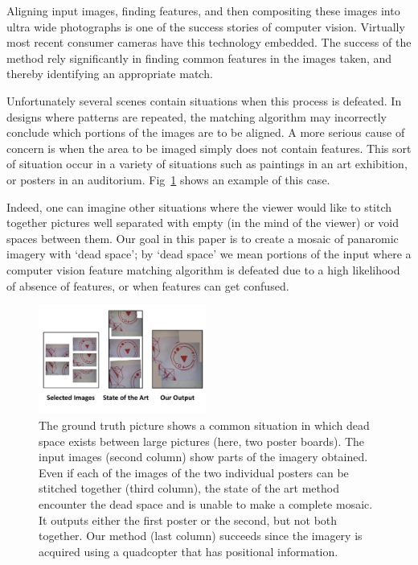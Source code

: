 \documentclass[10pt,twocolumn,letterpaper]{article}
\begin{document}
Aligning input images, finding features, and then compositing these
images into ultra wide photographs is one of the success stories of
computer vision.  Virtually most recent consumer cameras have this
technology embedded.  The success of the method rely significantly in
finding common features in the images taken, and thereby identifying an
appropriate match.

Unfortunately several scenes contain situations when this process is
defeated.  In designs where patterns are repeated, the matching
algorithm may incorrectly conclude which portions of the images are to
be aligned. 
A more serious cause of concern is when the area to be imaged simply
does not contain features.  This sort of situation occur in a variety
of situations such as paintings in an art exhibition, or posters in an
auditorium.  Fig~\ref{fig:teaser} shows an example of this
case. 

Indeed, one can imagine other situations where the viewer would like
to stitch together pictures well separated with empty (in the mind of
the viewer) or void spaces between them.  Our goal in this paper is to
create a mosaic of panaromic imagery with `dead space';
by `dead space' we mean portions of the input where a computer vision
feature matching algorithm is defeated due to a high likelihood of
absence of features, or when features can get confused.

\begin{figure}[t!]
  \centering
  \includegraphics[width=0.49\textwidth]{figures/teaser1}
  \caption{ \label{fig:teaser} The ground truth picture shows a common
    situation in which dead space exists between large pictures (here,
    two poster boards). The input images (second column) show parts of
    the imagery obtained. Even if each of the images of the two
    individual posters can be stitched together (third column), the
    state of the art method encounter the dead space and is unable to
    make a complete mosaic.  It outputs either the first poster or the
    second, but not both together.  Our method (last column) succeeds
    since the imagery is acquired using a quadcopter that has
    positional information.}
\end{figure}
\end{document}
